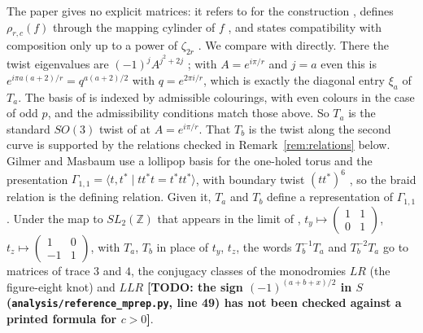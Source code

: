 \documentclass[11pt]{amsart}
\newcommand{\todo}[1]{\textbf{[TODO: #1]}}
\theoremstyle{definition}
\theoremstyle{remark}
\newcommand{\Z}{\mathbb{Z}}
\begin{document}
The paper \cite{DK} gives no explicit matrices: it refers to \cite{BHMV} for the
construction \cite[Section~2.1]{DK}, defines $\rho_{r,c}(f)$ through the mapping
cylinder of $f$ \cite[Section~2.2]{DK}, and states compatibility with composition only
up to a power of $\zeta_{2r}$ \cite[Thm.~2.1(5)]{DK}. We compare with \cite{BHMV}
directly. There the twist eigenvalues are $(-1)^j A^{j^2+2j}$
\cite[5.8]{BHMV}; with $A = e^{i\pi/r}$ and $j = a$ even this is
$e^{i\pi a(a+2)/r} = q^{a(a+2)/2}$ with $q = e^{2\pi i/r}$, which is exactly the
diagonal entry $\xi_a$ of $T_a$. The basis of \cite[4.11]{BHMV} is indexed by
admissible colourings, with even colours in the case of odd $p$, and the admissibility
conditions \cite[4.3--4.4]{BHMV} match those above. So $T_a$ is the standard $SO(3)$
twist of \cite{BHMV} at $A = e^{i\pi/r}$. That $T_b$ is the twist along the second
curve is supported by the relations checked in Remark~\ref{rem:relations} below.
Gilmer and Masbaum \cite{GM}
use a lollipop basis for the one-holed torus and the presentation
$\Gamma_{1,1} = \langle t, t^* \mid t t^* t = t^* t t^* \rangle$, with boundary twist
$(tt^*)^6$ \cite[Section~1, (1) and (2)]{GM}, so the braid relation is the defining
relation. Given it, $T_a$ and $T_b$
define a representation of $\Gamma_{1,1}$. Under the map to $SL_2(\Z)$ that appears in
the limit of \cite{San}, $t_y \mapsto \left(\begin{smallmatrix}1&1\\0&1\end{smallmatrix}\right)$,
$t_z \mapsto \left(\begin{smallmatrix}1&0\\-1&1\end{smallmatrix}\right)$, with $T_a$,
$T_b$ in place of $t_y$, $t_z$, the words
$T_b^{-1}T_a$ and $T_b^{-2}T_a$ go to matrices of trace $3$ and $4$, the conjugacy
classes of the monodromies $LR$ (the figure-eight knot) and $LLR$
\todo{the sign $(-1)^{(a+b+x)/2}$ in $S$ (\texttt{analysis/reference\_mprep.py},
line 49) has not been checked against a printed formula for $c > 0$}.
\end{document}
